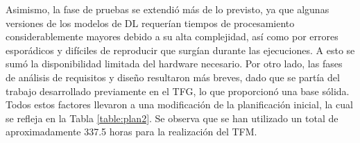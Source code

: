 Asimismo, la fase de pruebas se extendió más de lo previsto, ya que algunas versiones de los modelos de DL requerían tiempos de procesamiento considerablemente mayores debido a su alta complejidad, así como por errores esporádicos y difíciles de reproducir que surgían durante las ejecuciones. A esto se sumó la disponibilidad limitada del hardware necesario. Por otro lado, las fases de análisis de requisitos y diseño resultaron más breves, dado que se partía del trabajo desarrollado previamente en el TFG, lo que proporcionó una base sólida. Todos estos factores llevaron a una modificación de la planificación inicial, la cual se refleja en la Tabla \ref{table:plan2}. Se observa que se han utilizado un total de aproximadamente 337.5 horas para la realización del TFM.

\begin{table}[h]
\end{table}
